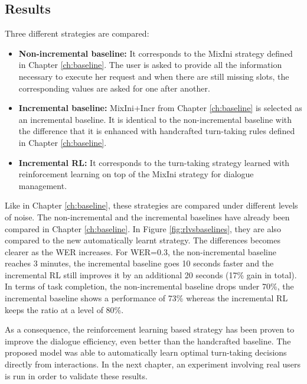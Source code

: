 \begin{figure*}[htp]
\begin{minipage}{.47\textwidth}
\end{minipage}
\caption{Mean dialogue duration and task for the non-incremental, the baseline incremental and the RL incremental (after convergence) strategies under different noise conditions.}
\label{fig:rlvsbaselines}
\end{figure*}
   
   	\subsection{Results}
    
    	Three different strategies are compared:
        \begin{itemize}
        	\item \textbf{Non-incremental baseline:} It corresponds to the MixIni strategy defined in Chapter \ref{ch:baseline}. The user is asked to provide all the information necessary to execute her request and when there are still missing slots, the corresponding values are asked for one after another.
            \item \textbf{Incremental baseline:} MixIni+Incr from Chapter \ref{ch:baseline} is selected as an incremental baseline. It is identical to the non-incremental baseline with the difference that it is enhanced with handcrafted turn-taking rules defined in Chapter \ref{ch:baseline}.
            \item \textbf{Incremental RL:} It corresponds to the turn-taking strategy learned with reinforcement learning on top of the MixIni strategy for dialogue management.
        \end{itemize}
        
        Like in Chapter \ref{ch:baseline}, these strategies are compared under different levels of noise. The non-incremental and the incremental baselines have already been compared in Chapter \ref{ch:baseline}. In Figure \ref{fig:rlvsbaselines}, they are also compared to the new automatically learnt strategy. The differences becomes clearer as the WER increases. For WER=0.3, the non-incremental baseline reaches 3 minutes, the incremental baseline goes 10 seconds faster and the incremental RL still improves it by an additional 20 seconds (17\% gain in total). In terms of task completion, the non-incremental baseline drops under 70\%, the incremental baseline shows a performance of 73\% whereas the incremental RL keeps the ratio at a level of 80\%.

        As a consequence, the reinforcement learning based strategy has been proven to improve the dialogue efficiency, even better than the handcrafted baseline. The proposed model was able to automatically learn optimal turn-taking decisions directly from interactions. In the next chapter, an experiment involving real users is run in order to validate these results.
